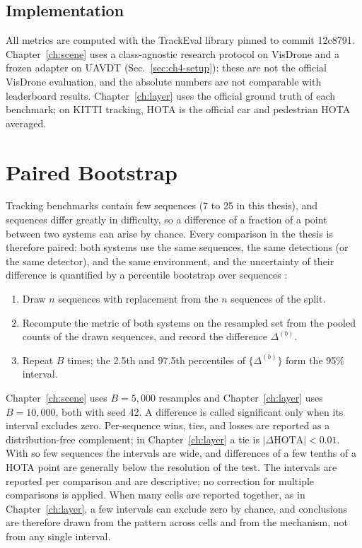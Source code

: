 \subsection{Implementation}
All metrics are computed with the TrackEval library pinned to commit 12c8791. Chapter~\ref{ch:scene} uses a class-agnostic research protocol on VisDrone and a frozen adapter on UAVDT (Sec.~\ref{sec:ch4-setup}); these are not the official VisDrone evaluation, and the absolute numbers are not comparable with leaderboard results. Chapter~\ref{ch:layer} uses the official ground truth of each benchmark; on KITTI tracking, HOTA is the official car and pedestrian HOTA averaged.

\section{Paired Bootstrap}\label{sec:m-bootstrap}
Tracking benchmarks contain few sequences (7 to 25 in this thesis), and sequences differ greatly in difficulty, so a difference of a fraction of a point between two systems can arise by chance. Every comparison in the thesis is therefore paired: both systems use the same sequences, the same detections (or the same detector), and the same environment, and the uncertainty of their difference is quantified by a percentile bootstrap over sequences \cite{efron1993bootstrap}:
\begin{enumerate}
\item Draw $n$ sequences with replacement from the $n$ sequences of the split.
\item Recompute the metric of both systems on the resampled set from the pooled counts of the drawn sequences, and record the difference $\Delta^{(b)}$.
\item Repeat $B$ times; the 2.5th and 97.5th percentiles of $\{\Delta^{(b)}\}$ form the 95\% interval.
\end{enumerate}
Chapter~\ref{ch:scene} uses $B=5{,}000$ resamples and Chapter~\ref{ch:layer} uses $B=10{,}000$, both with seed 42. A difference is called significant only when its interval excludes zero. Per-sequence wins, ties, and losses are reported as a distribution-free complement; in Chapter~\ref{ch:layer} a tie is $|\Delta\mathrm{HOTA}|<0.01$. With so few sequences the intervals are wide, and differences of a few tenths of a HOTA point are generally below the resolution of the test. The intervals are reported per comparison and are descriptive; no correction for multiple comparisons is applied. When many cells are reported together, as in Chapter~\ref{ch:layer}, a few intervals can exclude zero by chance, and conclusions are therefore drawn from the pattern across cells and from the mechanism, not from any single interval.

